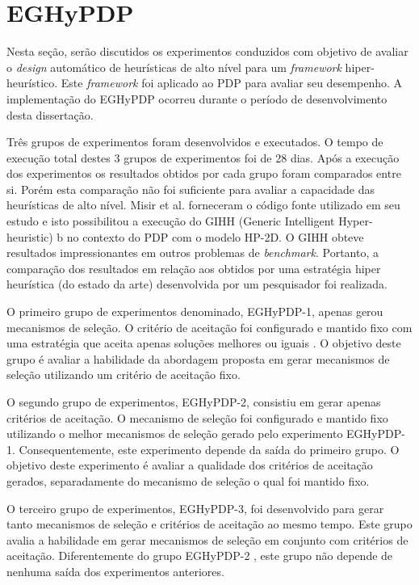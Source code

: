 \section{EGHyPDP}

Nesta seção, serão discutidos  os experimentos conduzidos com objetivo de avaliar o \textit{design} automático de heurísticas de alto nível para um \textit{framework} hiper-heurístico. Este \textit{framework} foi aplicado ao PDP para avaliar seu desempenho. A implementação do EGHyPDP ocorreu durante o período de desenvolvimento desta dissertação. 


Três grupos de experimentos foram desenvolvidos e executados. O tempo de execução total destes 3 grupos de experimentos foi de 28 dias. Após a execução dos experimentos os resultados obtidos por cada grupo foram comparados entre si. Porém esta comparação não foi suficiente para avaliar a capacidade das heurísticas de alto nível. Misir et al. forneceram o código fonte utilizado em seu estudo e isto possibilitou a execução do GIHH (Generic Intelligent Hyper-heuristic) \cite{misir2012intelligent}b no contexto do PDP com o modelo HP-2D. O GIHH obteve resultados impressionantes em outros problemas de \textit{benchmark}. Portanto, a comparação dos resultados em relação aos obtidos por uma estratégia hiper heurística (do estado da arte) desenvolvida por um pesquisador foi realizada. 

O primeiro grupo de experimentos denominado, EGHyPDP-1, apenas gerou mecanismos de seleção. O critério de aceitação foi configurado e mantido fixo com uma estratégia que aceita apenas soluções melhores ou iguais \cite{burke2013hyper}. O objetivo deste grupo é avaliar a habilidade da abordagem proposta em gerar mecanismos de seleção utilizando um critério de aceitação fixo.

	O segundo grupo de experimentos, EGHyPDP-2, consistiu em gerar apenas critérios de aceitação. O mecanismo de seleção foi configurado e mantido fixo utilizando o melhor mecanismos de seleção gerado pelo experimento EGHyPDP-1. Consequentemente, este experimento depende da saída do primeiro grupo. O objetivo deste experimento é avaliar a qualidade dos critérios de aceitação gerados, separadamente do mecanismo de seleção o qual foi mantido fixo.
	
	O terceiro grupo de experimentos,  EGHyPDP-3, foi desenvolvido para gerar tanto mecanismos de seleção e critérios de aceitação ao mesmo tempo. Este grupo avalia a habilidade em gerar mecanismos de seleção em conjunto com critérios de aceitação. Diferentemente do grupo EGHyPDP-2  , este grupo não depende de nenhuma saída dos experimentos anteriores.


